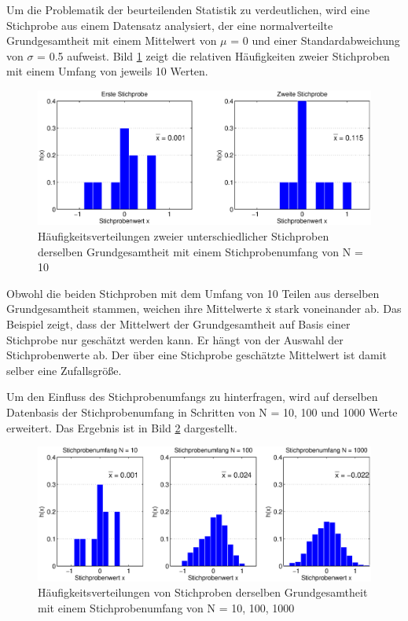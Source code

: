 \noindent Um die Problematik der beurteilenden Statistik zu verdeutlichen, wird eine Stichprobe aus einem Datensatz analysiert, der eine normalverteilte Grundgesamtheit mit einem Mittelwert von $\mu$ = 0 und einer Standardabweichung von $\sigma$ = 0.5 aufweist. Bild \ref{fig:StichprobenSchaetzungMotivation2} zeigt die relativen H\"{a}ufigkeiten zweier Stichproben mit einem Umfang von jeweils 10 Werten.

\noindent 
\begin{figure}[H]
  \centerline{\includegraphics[width=1\textwidth]{Kapitel5/Bilder/image2}}
  \caption{H\"{a}ufigkeitsverteilungen zweier unterschiedlicher Stichproben derselben Grundgesamtheit mit einem Stichprobenumfang von N = 10}
  \label{fig:StichprobenSchaetzungMotivation2}
\end{figure}

\noindent Obwohl die beiden Stichproben mit dem Umfang von 10 Teilen aus derselben Grundgesamtheit stammen, weichen ihre Mittelwerte $\overline{\mathrm{x}}$ stark voneinander ab. Das Beispiel zeigt, dass der Mittelwert der Grundgesamtheit auf Basis einer Stichprobe nur gesch\"{a}tzt werden kann. Er h\"{a}ngt von der Auswahl der Stichprobenwerte ab. Der \"{u}ber eine Stichprobe gesch\"{a}tzte Mittelwert ist damit selber eine Zufallsgr\"{o}{\ss}e. 

\clearpage

\noindent Um den Einfluss des Stichprobenumfangs zu hinterfragen, wird auf derselben Datenbasis der Stichprobenumfang in Schritten von N = 10, 100 und 1000 Werte erweitert. Das Ergebnis ist in Bild \ref{fig:StichprobenSchaetzungMotivation3} dargestellt. 

\noindent 
\begin{figure}[H]
  \centerline{\includegraphics[width=1\textwidth]{Kapitel5/Bilder/image3}}
  \caption{H\"{a}ufigkeitsverteilungen von Stichproben derselben Grundgesamtheit mit einem Stichprobenumfang von N = 10, 100, 1000 }
  \label{fig:StichprobenSchaetzungMotivation3}
\end{figure}

